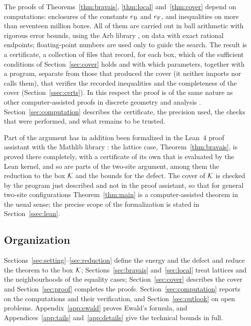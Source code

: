 The proofs of Theorems~\ref{thm:bravais}, \ref{thm:local} and~\ref{thm:cover} depend on computations: enclosures of the constants
$e_{\mathrm B}$ and $e_{\mathrm F}$, and inequalities on more than seventeen million boxes. All of them are carried out in ball arithmetic with rigorous
error bounds, using the Arb library \cite{Johansson2017Arb,flint}, on data with exact rational endpoints; floating-point numbers are
used only to guide the search. The result is a certificate, a collection of files that record, for each box, which of the
sufficient conditions of Section~\ref{sec:cover} holds and with which parameters, together with a program, separate from those that
produced the cover (it neither imports nor calls them), that verifies the recorded inequalities and the completeness of the cover
(Section~\ref{ssec:certs}). In this respect the proof is of the same nature as other computer-assisted proofs in discrete geometry
and analysis \cite{Hales2005,MuratovNovaga2026}. Section~\ref{sec:computation} describes the certificate, the precision used, the
checks that were performed, and what remains to be trusted.

Part of the argument has in addition been formalized in the Lean~4 proof assistant \cite{deMouraUllrich2021} with the Mathlib library
\cite{mathlib2020}: the lattice case, Theorem~\ref{thm:bravais}, is proved there completely, with a certificate of its own that is
evaluated by the Lean kernel, and so are parts of the two-site argument, among them the reduction to the box $\mathcal K$ and the bounds
for the defect. The cover of $\mathcal K$ is checked by the program just described and not in the proof assistant, so that for general
two-site configurations Theorem~\ref{thm:main} is a computer-assisted theorem in the usual sense; the precise scope of the
formalization is stated in Section~\ref{ssec:lean}.

\subsection{Organization}

Sections~\ref{sec:setting}--\ref{sec:reduction} define the energy and the defect and reduce the theorem to the box $\mathcal K$;
Sections~\ref{sec:bravais} and~\ref{sec:local} treat lattices and the neighbourhoods of the equality cases; Section~\ref{sec:cover}
describes the cover and Section~\ref{sec:proof} completes the proofs. Section~\ref{sec:computation} reports on the computations and
their verification, and Section~\ref{sec:outlook} on open problems. Appendix~\ref{app:ewald} proves Ewald's formula, and
Appendices~\ref{app:tails} and~\ref{app:details} give the technical bounds in full.
